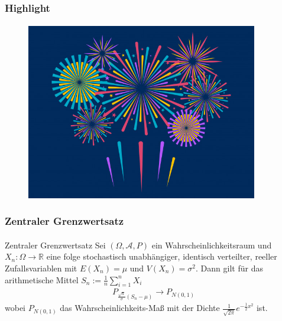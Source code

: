 \documentclass{beamer}
\begin{document}
\begin{frame}
    \frametitle{Highlight}
\framesubtitle{}
\begin{figure}[htp]
      \centering
    \includegraphics[width=0.9\textwidth]{img/firework}
\end{figure}
 \end{frame}


\begin{frame}
    \frametitle{Zentraler Grenzwertsatz}
\framesubtitle{}


\begin{block}{Zentraler Grenzwertsatz}
Sei $(\Omega, \mathcal{A}, P)$ ein Wahrscheinlichkeitsraum und $X_n :  \Omega \to \mathbb{R}$  eine folge stochastisch unabhängiger, identisch verteilter, reeller Zufallsvariablen mit $E(X_n) = \mu$ und $V(X_n)= \sigma^2$. Dann gilt für das arithmetische Mittel $S_n:= \frac{1}{n} \sum_{i=1}^n X_i$
\begin{align*}
P_{ \frac{\sqrt{n}}{\sigma} (S_n-\mu)} \to P_{N(0,1)}
\end{align*}
wobei $ P_{N(0,1)}$ das Wahrscheinlichkeits-Maß mit der Dichte $ \frac {1}{ \sqrt{2\pi}}e^{- \frac {1}{2} x^2}$ ist.
\end{block}

 \end{frame}
\end{document}
